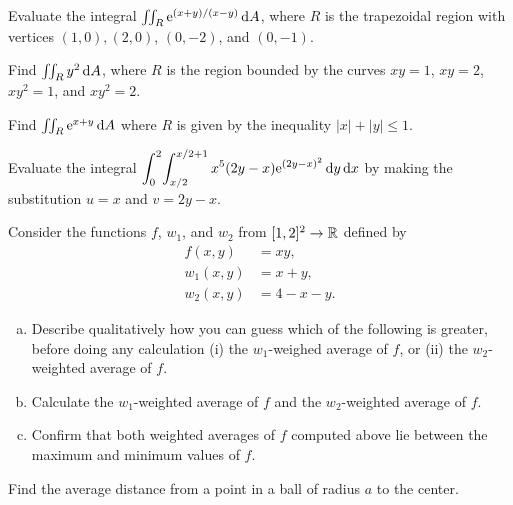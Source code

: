 \documentclass[prettycode,shellescape]{watsonbook}
\begin{document}
\begin{aexercise}
  Evaluate the integral $\iint_R \mathrm{e}^{(x+y)/(x-y)} \, {\mathrm{d}}A$, where $R$ is
  the trapezoidal region with vertices $(1,0), (2,0)$, $(0,-2)$, and
  $(0,-1)$.
\end{aexercise}

\begin{aexercise}
  Find $\iint_R y^2 \, {\mathrm{d}}A$, where $R$ is the region bounded by the
  curves $xy = 1$, $xy = 2$, $xy^2 = 1$, and $xy^2 = 2$.
\end{aexercise}

\begin{aexercise}
  Find $\iint_R \mathrm{e}^{x+y} \, {\mathrm{d}}A$ where $R$ is given by the inequality
  $|x| + |y| \leq 1$.
\end{aexercise}

\begin{aexercise}
  Evaluate the integral
  $\displaystyle{\int_{0}^{2}\!\int_{x/2}^{x/2+1} x^5 (2y -
    x)\mathrm{e}^{(2y-x)^2} \,\mathrm{d}y\,\mathrm{d}x}$ by making the substitution $u = x$ and
  $v=2y-x$.
\end{aexercise}


\begin{aexercise}
  Consider the functions $f$, $w_1$, and $w_2$ from $[1,2]^2 \to \mathbb{R}$
  defined by
  \begin{align*}
    f(x,y) &= xy, \\
    w_1(x,y) &= x + y, \\
    w_2(x,y) &= 4-x-y. 
  \end{align*}
  \begin{enumerate}[(a),leftmargin=12pt,itemsep=6pt]
  \item \label{part:qual} Describe qualitatively how you can guess
  which of the following is greater, before doing any calculation
  (i) the $w_1$-weighed average of $f$, or (ii) the $w_2$-weighted
  average of $f$.
  
  \item \label{part:quant} Calculate the $w_1$-weighted average of
  $f$ and the $w_2$-weighted average of $f$.

  \item \label{ref:inequality} Confirm that both weighted averages
  of $f$ computed above lie between the maximum and minimum values of
  $f$.
\end{enumerate}
\end{aexercise}

\begin{aexercise}
  Find the average distance from a point in a ball of radius $a$ to
  the center. 
\end{aexercise}
\end{document}
